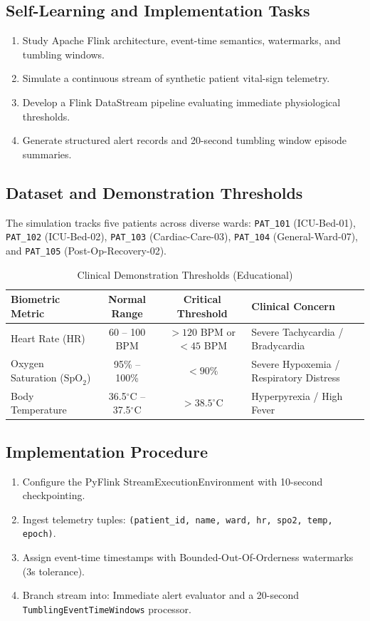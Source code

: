 \documentclass[12pt,a4paper]{report}
\begin{document}
\subsection{Self-Learning and Implementation Tasks}
\begin{enumerate}
    \item Study Apache Flink architecture, event-time semantics, watermarks, and tumbling windows.
    \item Simulate a continuous stream of synthetic patient vital-sign telemetry.
    \item Develop a Flink DataStream pipeline evaluating immediate physiological thresholds.
    \item Generate structured alert records and 20-second tumbling window episode summaries.
\end{enumerate}

\subsection{Dataset and Demonstration Thresholds}
The simulation tracks five patients across diverse wards: \texttt{PAT\_101} (ICU-Bed-01), \texttt{PAT\_102} (ICU-Bed-02), \texttt{PAT\_103} (Cardiac-Care-03), \texttt{PAT\_104} (General-Ward-07), and \texttt{PAT\_105} (Post-Op-Recovery-02).

\begin{table}[H]
\centering
\caption{Clinical Demonstration Thresholds (Educational)}
\begin{tabularx}{\textwidth}{|l|c|c|X|}
\hline
\textbf{Biometric Metric} & \textbf{Normal Range} & \textbf{Critical Threshold} & \textbf{Clinical Concern}\\
\hline
Heart Rate (HR) & 60 -- 100 BPM & $> 120$ BPM or $< 45$ BPM & Severe Tachycardia / Bradycardia\\
\hline
Oxygen Saturation ($\text{SpO}_2$) & 95\% -- 100\% & $< 90\%$ & Severe Hypoxemia / Respiratory Distress\\
\hline
Body Temperature & 36.5$^\circ$C -- 37.5$^\circ$C & $> 38.5^\circ$C & Hyperpyrexia / High Fever\\
\hline
\end{tabularx}
\end{table}

\subsection{Implementation Procedure}
\begin{enumerate}
    \item Configure the PyFlink StreamExecutionEnvironment with 10-second checkpointing.
    \item Ingest telemetry tuples: \texttt{(patient\_id, name, ward, hr, spo2, temp, epoch)}.
    \item Assign event-time timestamps with Bounded-Out-Of-Orderness watermarks (3s tolerance).
    \item Branch stream into: Immediate alert evaluator and a 20-second \texttt{TumblingEventTimeWindows} processor.
\end{enumerate}
\end{document}
